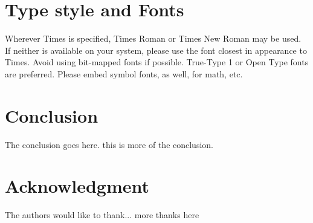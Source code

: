 \documentclass[10pt, conference, compsocconf,a4paper]{IEEEtran}
\begin{document}
\section{Type style and Fonts}
Wherever Times is specified, Times Roman or Times New Roman may be used. If neither is available on your system, please use the font closest in appearance to Times. Avoid using bit-mapped fonts if possible. True-Type 1 or Open Type fonts are preferred. Please embed symbol fonts, as well, for math, etc.

\section{Conclusion}
The conclusion goes here. this is more of the conclusion.


\section*{Acknowledgment}

The authors would like to thank...
more thanks here




\end{document}
